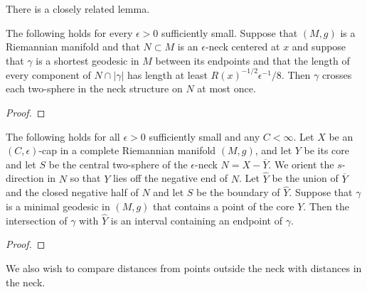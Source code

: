 There is a closely related lemma.

\begin{lemma}
\label{lem:geodesic-crosses-neck-once-general}
\label{genint}

The following holds for every $\epsilon>0$ sufficiently small.
Suppose that $(M,g)$ is a Riemannian manifold and that $N\subset M$
is an $\epsilon$-neck centered at $x$ and suppose that $\gamma$ is a
shortest geodesic in $M$ between its endpoints and that the length
of every component of $N\cap|\gamma|$ has length at least $
R(x)^{-1/2}\epsilon^{-1}/8$. Then $\gamma$ crosses each two-sphere
in the neck structure on $N$ at most once.
\end{lemma}


\begin{proof}
\sketch
{}
\end{proof}


\begin{corollary}
\label{cor:minimal-geodesic-through-core}
\label{coreint}

The following holds for all $\epsilon>0$ sufficiently small and any
$C<\infty$. Let $X$ be an $(C,\epsilon)$-cap in a complete
Riemannian manifold $(M,g)$, and let $Y$ be its core and let $S$ be
the central two-sphere of the $\epsilon$-neck $N=X-\overline Y$. We
orient the $s$-direction in $N$ so that $Y$ lies off the negative
end of $N$. Let $\widehat Y$ be the union of $\overline Y$ and the
closed negative half of $N$ and let $S$ be the boundary of $\widehat
Y$. Suppose that $\gamma$ is a minimal geodesic in $(M,g)$ that
contains a point of the core $Y$. Then the intersection of $\gamma$
with $\widehat Y$ is an interval containing an endpoint of $\gamma$.
\end{corollary}



\begin{proof}
\sketch
{}
\end{proof}




We also wish to compare distances from points outside the neck with
distances in the neck.

